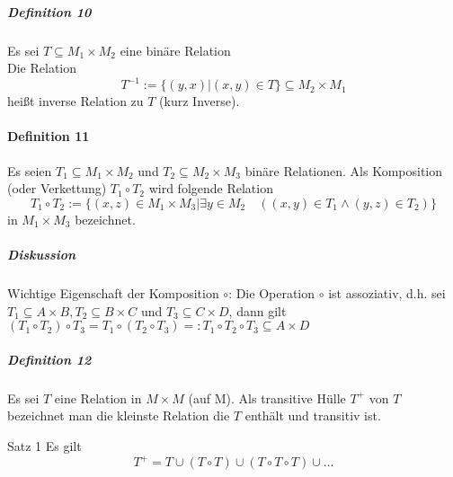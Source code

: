 \documentclass[a4paper]{scrartcl}
\begin{document}

\subparagraph{Definition 10} Es sei $T \subseteq M_1 \times M_2$ eine binäre Relation\\
Die Relation
\[ T^{-1} := \{ (y,x) | (x,y) \in T\} \subseteq M_2\times M_1\]
heißt inverse Relation zu $T$ (kurz Inverse).

\paragraph{Definition 11} Es seien $T_1 \subseteq M_1 \times M_2$ und $T_2 \subseteq M_2 \times M_3$ binäre Relationen. Als Komposition (oder Verkettung) $T_1 \circ T_2$ wird folgende Relation
\[T_1 \circ T_2 :=\{(x,z)\in M_1 \times M_3 | \exists y \in M_2 \quad ((x,y) \in T_1 \wedge (y,z) \in T_2 )\}\]
in $M_1 \times M_3$ bezeichnet.

\subparagraph{Diskussion}
Wichtige Eigenschaft der Komposition $\circ$:
Die Operation $\circ$ ist assoziativ, d.h.  sei $T_1 \subseteq A \times B, T_2 \subseteq B \times C$ und $T_3 \subseteq C \times D$, dann gilt $(T_1 \circ T_2)\circ T_3 = T_1 \circ (T_2 \circ T_3) =:  T_1 \circ T_2 \circ T_3 \subseteq A \times D$


\subparagraph{Definition 12}
Es sei $T$ eine Relation in $M \times M$ (auf M). Als transitive Hülle $T^+$ von $T$ bezeichnet man die kleinste Relation die $T$ enthält und transitiv ist.

Satz 1
Es gilt 
\[T^+ = T \cup (T \circ T) \cup (T \circ T \circ T) \cup ...\]
\end{document}
